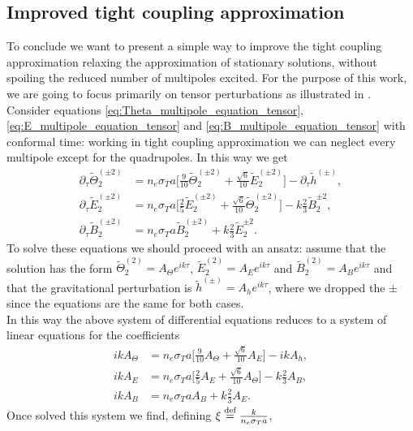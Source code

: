 \subsection{Improved tight coupling approximation}
To conclude we want to present a simple way to improve the tight coupling approximation relaxing the approximation of stationary solutions, without spoiling the reduced number of multipoles excited. For the purpose of this work, we are going to focus primarily on tensor perturbations as illustrated in \cite{Chluba_tens_diss}.
Consider equations \eqref{eq:Theta_multipole_equation_tensor}, \eqref{eq:E_multipole_equation_tensor} and \eqref{eq:B_multipole_equation_tensor} with conformal time: working in tight coupling approximation we can neglect every multipole except for the quadrupoles. In this way we get
\begin{align*}
    \partial_{\tau}\tilde\Theta_{2}^{(\pm2)}&=n_e\sigma_T a\bigg[\frac{9}{10} \tilde\Theta_{2}^{(\pm2)}+\frac{\sqrt{6}}{10}\tilde E_{2}^{(\pm2)}\bigg]-\partial_{\tau}\tilde h^{(\pm)},\\
    \partial_{\tau}\tilde E_{2}^{(\pm2)}&=n_e\sigma_T a\bigg[\frac{2}{5} \tilde E_{2}^{(\pm2)}+\frac{\sqrt{6}}{10}\tilde \Theta_{2}^{(\pm2)}\bigg]-k\frac{2}{3}\tilde B_2^{\pm2},\\
    \partial_{\tau}\tilde B_{2}^{(\pm2)}&=n_e\sigma_T a\tilde B_{2}^{(\pm2)}+k\frac{2}{3}\tilde E_2^{\pm2}.
\end{align*}
To solve these equations we should proceed with an ansatz: assume that the solution has the form $ \tilde\Theta_{2}^{(2)}=A_\Theta e^{ik\tau}$, $\tilde E_{2}^{(2)}=A_E e^{ik\tau}$ and $\tilde B_{2}^{(2)}=A_B e^{ik\tau}$ and that the gravitational perturbation is $\tilde h^{(\pm)}=A_he^{ik\tau}$, where we dropped the $\pm$ since the equations are the same for both cases.\\ In this way the above system of differential equations reduces to a system of linear equations for the coefficients
\begin{align*}
    ikA_\Theta&=n_e\sigma_T a\bigg[\frac{9}{10} A_\Theta+\frac{\sqrt{6}}{10}A_E\bigg]-ik A_h,\\
    ikA_E&=n_e\sigma_T a\bigg[\frac{2}{5} A_E+\frac{\sqrt{6}}{10}A_\Theta\bigg]-k\frac{2}{3}A_B,\\
    ikA_B&=n_e\sigma_T a A_B+k\frac{2}{3}A_E.
\end{align*}
Once solved this system we find, defining $\xi\stackrel{\text{def}}{=}\frac{k}{n_e\sigma_T a}$,
